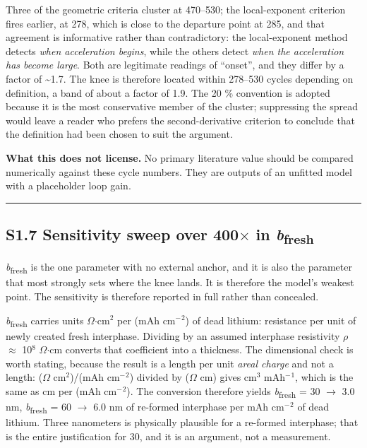 \documentclass[11pt,a4paper]{article}
\begin{document}
Three of the geometric criteria cluster at 470--530; the local-exponent criterion fires earlier, at 278, which is close to the departure point at 285, and that agreement is informative rather than contradictory: the local-exponent method detects \emph{when acceleration begins}, while the others detect \emph{when the acceleration has become large}. Both are legitimate readings of \textquotedblleft{}onset\textquotedblright{}, and they differ by a factor of \textasciitilde{}1.7. The knee is therefore located within 278--530 cycles depending on definition, a band of about a factor of 1.9. The 20 \% convention is adopted because it is the most conservative member of the cluster; suppressing the spread would leave a reader who prefers the second-derivative criterion to conclude that the definition had been chosen to suit the argument.


\textbf{What this does not license.} No primary literature value should be compared numerically against these cycle numbers. They are outputs of an unfitted model with a placeholder loop gain.


\par\noindent\rule{\linewidth}{0.4pt}\par


\subsection*{S1.7 Sensitivity sweep over 400\ensuremath{\times} in \emph{b}\textsubscript{fresh}}


\emph{b}\textsubscript{fresh} is the one parameter with no external anchor, and it is also the parameter that most strongly sets where the knee lands. It is therefore the model's weakest point. The sensitivity is therefore reported in full rather than concealed.


\emph{b}\textsubscript{fresh} carries units \ensuremath{\Omega}\ensuremath{\cdot}cm\ensuremath{^{2}} per (mAh cm\ensuremath{^{-}}\ensuremath{^{2}}) of dead lithium: resistance per unit of newly created fresh interphase. Dividing by an assumed interphase resistivity \ensuremath{\rho} \ensuremath{\approx} 10\ensuremath{^{8}} \ensuremath{\Omega}\ensuremath{\cdot}cm converts that coefficient into a thickness. The dimensional check is worth stating, because the result is a length per unit \emph{areal charge} and not a length: (\ensuremath{\Omega} cm\ensuremath{^{2}})/(mAh cm\ensuremath{^{-}}\ensuremath{^{2}}) divided by (\ensuremath{\Omega} cm) gives cm\ensuremath{^{3}} mAh\ensuremath{^{-}}\ensuremath{^{1}}, which is the same as cm per (mAh cm\ensuremath{^{-}}\ensuremath{^{2}}). The conversion therefore yields \emph{b}\textsubscript{fresh} = 30 \ensuremath{\rightarrow} 3.0 nm, \emph{b}\textsubscript{fresh} = 60 \ensuremath{\rightarrow} 6.0 nm of re-formed interphase per mAh cm\ensuremath{^{-}}\ensuremath{^{2}} of dead lithium. Three nanometers is physically plausible for a re-formed interphase; that is the entire justification for 30, and it is an argument, not a measurement.
\end{document}

